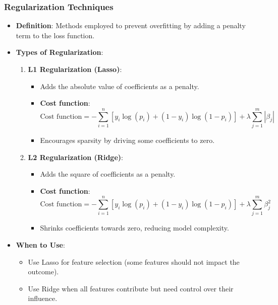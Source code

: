 \documentclass[aspectratio=169]{beamer}
\begin{document}
\begin{frame}[fragile]
    \frametitle{Regularization Techniques}
    \begin{itemize}
        \item \textbf{Definition}: Methods employed to prevent overfitting by adding a penalty term to the loss function.
        \item \textbf{Types of Regularization}:
        \begin{enumerate}
            \item \textbf{L1 Regularization (Lasso)}:
            \begin{itemize}
                \item Adds the absolute value of coefficients as a penalty.
                \item \textbf{Cost function}:
                \begin{equation}
                    \text{Cost function} = -\sum_{i=1}^{n} [y_i \log(p_i) + (1 - y_i) \log(1 - p_i)] + \lambda \sum_{j=1}^{m} | \beta_j |
                \end{equation}
                \item Encourages sparsity by driving some coefficients to zero.
            \end{itemize}
            \item \textbf{L2 Regularization (Ridge)}:
            \begin{itemize}
                \item Adds the square of coefficients as a penalty.
                \item \textbf{Cost function}:
                \begin{equation}
                    \text{Cost function} = -\sum_{i=1}^{n} [y_i \log(p_i) + (1 - y_i) \log(1 - p_i)] + \lambda \sum_{j=1}^{m} \beta_j^2
                \end{equation}
                \item Shrinks coefficients towards zero, reducing model complexity.
            \end{itemize}
        \end{enumerate}
        \item \textbf{When to Use}:
        \begin{itemize}
            \item Use Lasso for feature selection (some features should not impact the outcome).
            \item Use Ridge when all features contribute but need control over their influence.
        \end{itemize}
    \end{itemize}
\end{frame}
\end{document}
